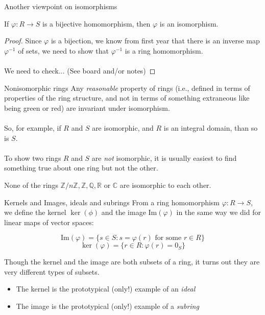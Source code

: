 \documentclass{beamer}
\newcommand{\C}{\mathbb{C}}
\newcommand{\Z}{\mathbb{Z}}
\newcommand{\Q}{\mathbb{Q}}
\newcommand{\R}{\mathbb{R}}
\begin{document}
\begin{frame}{Another viewpoint on isomorphisms}
  \begin{lemma} If $\varphi:R\to S$ is a bijective homomorphism, then $\varphi$ is an isomorphism.
  \end{lemma}

  \begin{proof} Since $\varphi$ is a bijection, we know from first year that there is an inverse map $\varphi^{-1}$ of sets, we need to show that $\varphi^{-1}$ is a ring homomorphism.  \\~\\

    We need to check... (See board and/or notes)

 \end{proof}
  
\end{frame}

\begin{frame}{Nonisomorphic rings}
  Any \emph{reasonable} property of rings (i.e., defined in terms of properties of the ring structure, and not in terms of something extraneous like being {\color{green}green} or {\color{red}red}) are invariant under isomorphism.
\\~\\
So, for example, if $R$ and $S$ are isomorphic, and $R$ is an integral domain, than so is $S$.
\\~\\
To show two rings $R$ and $S$ are \emph{not} isomorphic, it is usually easiest to find something true about one ring but not the other.


\begin{lemma} None of the rings $\Z/n\Z, \Z, \Q,\R$ or $\C$ are isomorphic to each other. \end{lemma}
  \end{frame}




\begin{frame}{Kernels and Images, ideals and subrings}
  From a ring homomorphism $\varphi:R\to S$, we define the kernel $\ker(\phi)$ and the image $\text{Im}(\varphi)$ in the same way we did for linear maps of vector spaces:

  $$\text{Im}(\varphi)=\{s\in S : s=\varphi(r) \text{ for some } r\in R\}$$
    $$\ker(\varphi)=\{r\in R : \varphi(r)=0_S\}$$

Though the kernel and the image are both subsets of a ring, it turns out they are very different types of subsets.

\begin{itemize}
\item The kernel is the prototypical (only!) example of an \emph{ideal}
  \item The image is the prototypical (only!) example of a \emph{subring}
\end{itemize}
\end{frame}
\end{document}
